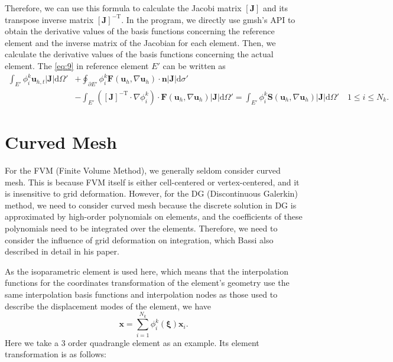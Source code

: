 \documentclass{develop-note}
\begin{document}
Therefore, we can use this formula to calculate the Jacobi matrix $[\mathbf{J}]$ and its transpose inverse matrix $[\mathbf{J}]^{-\mathrm{T}}$. In the program, we directly use gmsh's API to obtain the derivative values of the basis functions concerning the reference element and the inverse matrix of the Jacobian for each element. Then, we calculate the derivative values of the basis functions concerning the actual element. The \autoref{eq:9} in reference element $E'$ can be written as
\begin{equation}
  \label{eq:35}
  \begin{aligned}
    \int_{E'}\phi_{i}^{k}\mathbf{u}_{h,t}|\mathbf{J}|\mathrm{d}\Omega' &+\oint_{\partial E'}\phi_{i}^{k}\mathbf{F}(\mathbf{u}_{h},\nabla\mathbf{u}_{h})\cdot\mathbf{n}|\mathbf{J}|\mathrm{d}\sigma'\\
    &-\int_{E'}\left([\mathbf{J}]^{-\mathrm{T}}\cdot\nabla\phi_{i}^{k}\right)\cdot\mathbf{F}(\mathbf{u}_{h},\nabla\mathbf{u}_{h})|\mathbf{J}|\mathrm{d}\Omega'=\int_{E'}\phi_{i}^{k}\mathbf{S}(\mathbf{u}_{h},\nabla\mathbf{u}_{h})|\mathbf{J}|\mathrm{d}\Omega'\quad 1\leqslant i\leqslant N_{k}.
  \end{aligned}
\end{equation}

\section{Curved Mesh}

For the FVM (Finite Volume Method), we generally seldom consider curved mesh. This is because FVM itself is either cell-centered or vertex-centered, and it is insensitive to grid deformation. However, for the DG (Discontinuous Galerkin) method, we need to consider curved mesh because the discrete solution in DG is approximated by high-order polynomials on elements, and the coefficients of these polynomials need to be integrated over the elements. Therefore, we need to consider the influence of grid deformation on integration, which Bassi also described in detail in his paper\cite{bassiHighOrderAccurateDiscontinuous1997}.

As the isoparametric element is used here, which means that the interpolation functions for the coordinates transformation of the element's geometry use the same interpolation basis functions and interpolation nodes as those used to describe the displacement modes of the element, we have
\begin{equation}
  \mathbf{x}=\sum_{i=1}^{N_{k}}\phi_{i}^{k}(\bm{\xi})\mathbf{x}_{i}.
\end{equation}
Here we take a 3 order quadrangle element as an example. Its element transformation is as follows:
\end{document}
